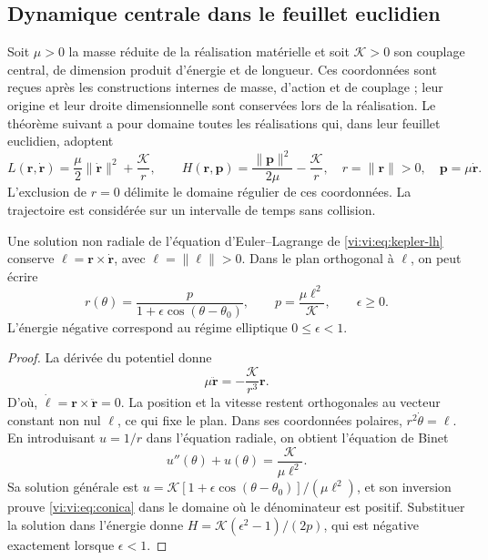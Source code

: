 \subsection{Dynamique centrale dans le feuillet euclidien}
\label{vi:vi:subsec:dinamica-central}

Soit $\mu>0$ la masse réduite de la réalisation matérielle et soit
$\mathcal K>0$ son couplage central, de dimension
produit d’énergie et de longueur. Ces coordonnées sont reçues après
les constructions internes de masse, d’action et de couplage ;
leur origine et leur droite dimensionnelle sont conservées lors de la
réalisation. Le théorème suivant a pour domaine toutes
les réalisations qui, dans leur feuillet euclidien, adoptent
\begin{equation}
 L(\mathbf r,\dot{\mathbf r})
 =\frac\mu2\|\dot{\mathbf r}\|^2+\frac{\mathcal K}{r},
 \qquad
 H(\mathbf r,\mathbf p)
 =\frac{\|\mathbf p\|^2}{2\mu}-\frac{\mathcal K}{r},
 \quad r=\|\mathbf r\|>0,
 \quad\mathbf p=\mu\dot{\mathbf r}.
 \label{vi:vi:eq:kepler-lh}
\end{equation}
L’exclusion de $r=0$ délimite le domaine régulier de ces
coordonnées. La trajectoire est considérée sur un intervalle de
temps sans collision.

\begin{proposition}
\label{vi:vi:prop:conica}
Une solution non radiale de l’équation d’Euler--Lagrange de
\eqref{vi:vi:eq:kepler-lh} conserve
$\boldsymbol\ell=\mathbf r\times\dot{\mathbf r}$, avec
$\ell=\|\boldsymbol\ell\|>0$. Dans le plan orthogonal à
$\boldsymbol\ell$, on peut écrire
\begin{equation}
 r(\theta)=\frac{p}{1+\epsilon\cos(\theta-\theta_0)},
 \qquad p=\frac{\mu\ell^2}{\mathcal K},
 \qquad \epsilon\geq0.
 \label{vi:vi:eq:conica}
\end{equation}
L’énergie négative correspond au régime elliptique
$0\leq\epsilon<1$.
\end{proposition}
\begin{proof}
La dérivée du potentiel donne
\begin{equation}
 \mu\ddot{\mathbf r}=-\frac{\mathcal K}{r^3}\mathbf r.
 \label{vi:vi:eq:fuerza-central}
\end{equation}
D’où,
$\dot{\boldsymbol\ell}=\mathbf r\times\ddot{\mathbf r}=0$.
La position et la vitesse restent orthogonales au vecteur
constant non nul $\boldsymbol\ell$, ce qui fixe le plan.
Dans ses coordonnées polaires, $r^2\dot\theta=\ell$. En introduisant
$u=1/r$ dans l’équation radiale, on obtient l’équation de Binet
\[
 u''(\theta)+u(\theta)=\frac{\mathcal K}{\mu\ell^2}.
\]
Sa solution générale est
$u=\mathcal K[1+\epsilon\cos(\theta-\theta_0)]/(\mu\ell^2)$,
et son inversion prouve \eqref{vi:vi:eq:conica} dans le domaine
où le dénominateur est positif. Substituer la solution dans
l’énergie donne
$H=\mathcal K(\epsilon^2-1)/(2p)$, qui est négative
exactement lorsque $\epsilon<1$.
\end{proof}

